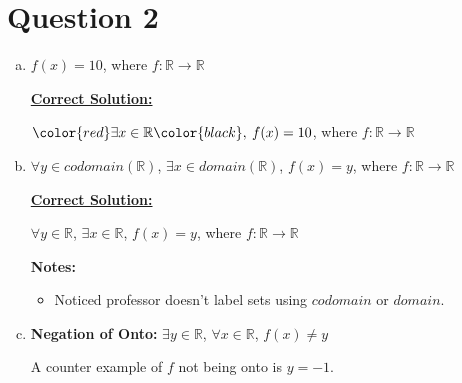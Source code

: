 \documentclass[12pt]{article}
\begin{document}
\section*{Question 2}
\begin{enumerate}[a.]
    \item

    $f(x) = 10$, where $f:\mathbb{R} \to \mathbb{R}$

    \bigskip

    \begin{mdframed}
        \underline{\textbf{Correct Solution:}}

        \bigskip

        $\color{red}\exists x \in \mathbb{R}\color{black},\:f(x) = 10$, where $f:\mathbb{R} \to \mathbb{R}$

    \end{mdframed}

    \item

    $\forall y \in codomain(\mathbb{R})$, $\exists x \in domain(\mathbb{R})$, $f(x) = y$, where $f:\mathbb{R} \to \mathbb{R}$

    \bigskip

    \begin{mdframed}
        \underline{\textbf{Correct Solution:}}

        \bigskip

        \color{red}$\forall y \in \mathbb{R}$, $\exists x \in \mathbb{R}$\color{black}, $f(x) = y$, where $f:\mathbb{R} \to \mathbb{R}$

    \end{mdframed}

    \bigskip

    \textbf{Notes:}

    \begin{itemize}
        \item Noticed professor doesn't label sets using $codomain$ or $domain$.
    \end{itemize}

    \item

    \textbf{Negation of Onto:} $\exists y \in \mathbb{R}$, $\forall x \in \mathbb{R}$, $f(x) \neq y$

    \bigskip

    A counter example of $f$ not being onto is $y = -1$.

\end{enumerate}
\end{document}
